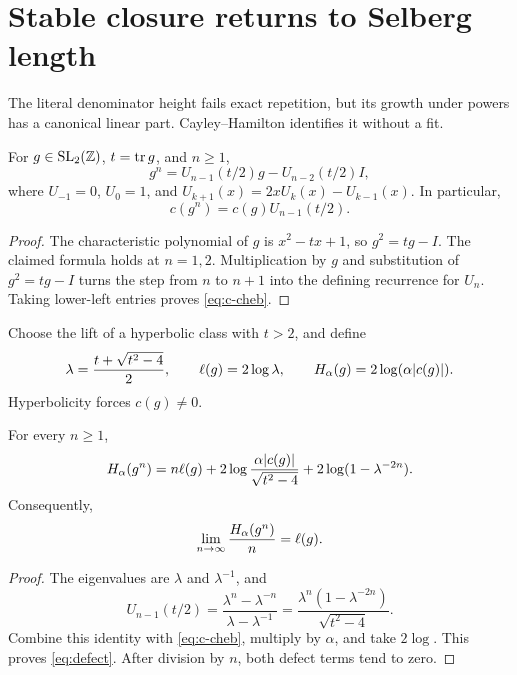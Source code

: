 \section{Stable closure returns to Selberg length}

The literal denominator height fails exact repetition, but its growth under
powers has a canonical linear part.  Cayley--Hamilton identifies it without a
fit.

\begin{proposition}\label{prop:chebyshev}
For $g\in\operatorname{SL}_2(\mathbb Z)$, $t=\operatorname{tr} g$, and $n\geq1$,
\[
 g^n=U_{n-1}(t/2)g-U_{n-2}(t/2)I,
\]
where $U_{-1}=0$, $U_0=1$, and
$U_{k+1}(x)=2xU_k(x)-U_{k-1}(x)$.  In particular,
\begin{equation}\label{eq:c-cheb}
 c(g^n)=c(g)U_{n-1}(t/2).
\end{equation}
\end{proposition}

\begin{proof}
The characteristic polynomial of $g$ is $x^2-tx+1$, so
$g^2=tg-I$.  The claimed formula holds at $n=1,2$.  Multiplication by $g$
and substitution of $g^2=tg-I$ turns the step from $n$ to $n+1$ into the
defining recurrence for $U_n$.  Taking lower-left entries proves
\eqref{eq:c-cheb}.
\end{proof}

Choose the lift of a hyperbolic class with $t>2$, and define
\[
 \lambda=\frac{t+\sqrt{t^2-4}}2,\qquad
 \ell(g)=2\log\lambda,\qquad
 H_\alpha(g)=2\log(\alpha|c(g)|).
\]
Hyperbolicity forces $c(g)\ne0$.

\begin{theorem}\label{thm:stable}
For every $n\geq1$,
\begin{equation}\label{eq:defect}
 H_\alpha(g^n)
 =n\ell(g)
 +2\log\frac{\alpha|c(g)|}{\sqrt{t^2-4}}
 +2\log(1-\lambda^{-2n}).
\end{equation}
Consequently,
\[
 \lim_{n\to\infty}\frac{H_\alpha(g^n)}n=\ell(g).
\]
\end{theorem}

\begin{proof}
The eigenvalues are $\lambda$ and $\lambda^{-1}$, and
\[
 U_{n-1}(t/2)
 =\frac{\lambda^n-\lambda^{-n}}{\lambda-\lambda^{-1}}
 =\frac{\lambda^n(1-\lambda^{-2n})}{\sqrt{t^2-4}}.
\]
Combine this identity with \eqref{eq:c-cheb}, multiply by $\alpha$, and take
$2\log$.  This proves \eqref{eq:defect}.  After division by $n$, both defect
terms tend to zero.
\end{proof}

